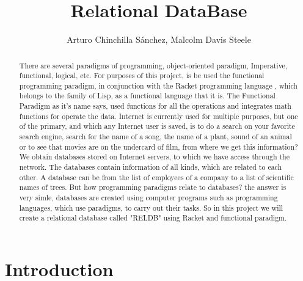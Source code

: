 \documentclass[12pt]{article}
\title{Relational DataBase}
\author{Arturo Chinchilla Sánchez, Malcolm Davis Steele}
\begin{document}
\maketitle
\begin{abstract}
There are several paradigms of programming, object-oriented paradigm, Imperative, functional, logical, etc. For purposes of this project, is be used the functional programming paradigm, in conjunction with the Racket programming language , which belongs to the family of Lisp, as a functional language that it is. The Functional Paradigm as it's name says, used functions for all the operations and integrates math functions for operate the data. 
Internet is currently used for multiple purposes, but one of the primary, and which any Internet user is saved, is to do a search on your favorite search engine, search for the name of a song, the name of a plant, sound of an animal or to see that movies are on the undercard of film, from where we get this information? We obtain databases stored on Internet servers, to which we have access through the network. The databases contain information of all kinds, which are related to each other. A database can be from the list of employees of a company to a list of scientific names of trees.
But how programming paradigms relate to databases? the answer is very simle, databases are created using computer programs such as programming languages, which use paradigms, to carry out their tasks. So in this project we will create a relational database called "RELDB" using Racket and functional paradigm.
\end{abstract}

\newpage
\tableofcontents %
\listoffigures %

\newpage
\section{Introduction}
\end{document}
